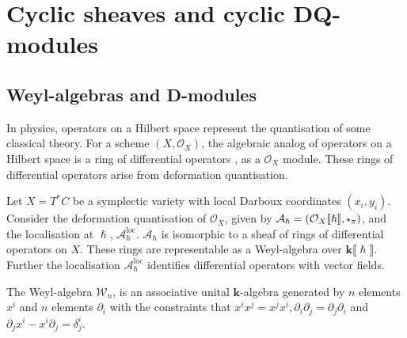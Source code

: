    \fi 
   
    \section{Cyclic sheaves and cyclic DQ-modules}
       

    \subsection{Weyl-algebras and D-modules}
    \label{sec:weyl_algebra}
    
    In physics, operators on a Hilbert space represent the quantisation of some classical theory. For a scheme \( (X,\mathcal{O}_X)\), the algebraic analog of operators on a Hilbert space is a ring of differential operators \cite{k_holonomic}, as a \( \mathcal{O}_X\) module. These rings of differential operators arise from deformation quantisation.

    Let \(X= T^* C\) be a symplectic variety with local Darboux coordinates \( (x_i,y_i)\). Consider the deformation quantisation of \( \mathcal{O}_X\), given by \( \mathcal{A}_{\hslash} = (\mathcal{O}_X\lBrack \hslash \rBrack , \starp_{\pi}) \), and the localisation at \(\hslash\), \( \mathcal{A}_{\hslash}^{\text{loc}} \). \( \mathcal{A}_{\hslash}\) is isomorphic to a sheaf of rings of differential operators on \(X\). These rings are representable as a Weyl-algebra over \( \mathbf{k} \lBrack \hslash \rBrack\). Further the localisation \( \mathcal{A}_{\hslash}^{\text{loc}}\) identifies differential operators with vector fields. 
    

    \begin{defn} 
    The Weyl-algebra \( \mathcal{W}_{n}\), is an associative unital \( \mathbf{k}\)-algebra generated by \(n\) elements \( x^{i}\) and \(n\) elements \( \partial_i\) with the constraints that \( x^i x^j = x^j x^i, \partial_i \partial_j = \partial_j \partial_i\) and \( \partial_j x^i - x^i \partial_j  = \delta^{i}_j\).
    \end{defn}
    
    

